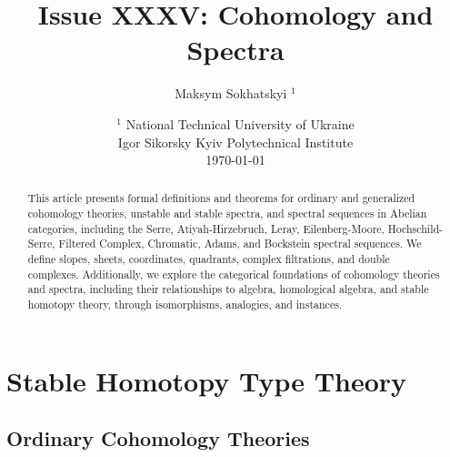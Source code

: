 \documentclass{article}
\begin{document}
\title{Issue XXXV: Cohomology and Spectra}
\author{Maksym Sokhatskyi $^1$}
\date{ $^1$ National Technical University of Ukraine \\
       \small Igor Sikorsky Kyiv Polytechnical Institute \\
       \today }

\maketitle

\begin{abstract}
This article presents formal definitions and theorems for ordinary and
generalized cohomology theories, unstable and stable spectra,
and spectral sequences in Abelian categories, including the Serre,
Atiyah-Hirzebruch, Leray, Eilenberg-Moore, Hochschild-Serre,
Filtered Complex, Chromatic, Adams, and Bockstein spectral sequences.
We define slopes, sheets, coordinates, quadrants, complex filtrations,
and double complexes. Additionally, we explore the categorical foundations
of cohomology theories and spectra, including their relationships to algebra,
homological algebra, and stable homotopy theory, through isomorphisms,
 analogies, and instances.
\end{abstract}

\ifincludeTOC
\tableofcontents
\fi

\newpage
\section{Stable Homotopy Type Theory}

\subsection{Ordinary Cohomology Theories}
\end{document}

